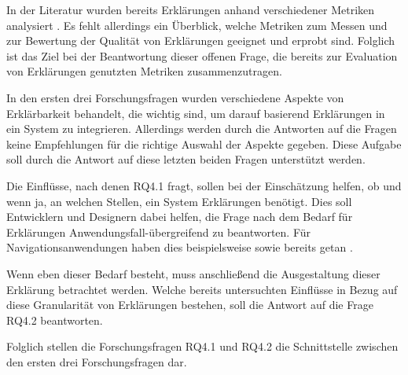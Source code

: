 In der Literatur wurden bereits Erklärungen anhand verschiedener Metriken analysiert \cite{wiegand2019drive,briand1995goal}. Es fehlt allerdings ein Überblick, welche Metriken zum Messen und zur Bewertung der Qualität von Erklärungen geeignet und erprobt sind. Folglich ist das Ziel bei der Beantwortung dieser offenen Frage, die bereits zur Evaluation von Erklärungen genutzten Metriken zusammenzutragen.

\smallskip

\noindent{}

\smallskip

In den ersten drei Forschungsfragen wurden verschiedene Aspekte von Erklärbarkeit behandelt, die wichtig sind, um darauf basierend Erklärungen in ein System zu integrieren. Allerdings werden durch die Antworten auf die Fragen keine Empfehlungen für die richtige Auswahl der Aspekte gegeben. Diese Aufgabe soll durch die Antwort auf diese letzten beiden Fragen unterstützt werden.

Die Einflüsse, nach denen RQ4.1 fragt, sollen bei der Einschätzung helfen, ob und wenn ja, an welchen Stellen, ein System Erklärungen benötigt. Dies soll Entwicklern und Designern dabei helfen, die Frage nach dem Bedarf für Erklärungen Anwendungsfall-übergreifend zu beantworten. Für Navigationsanwendungen haben dies beispielsweise \citeauthor{chazette_end-users_nodate} sowie \citeauthor{wang_integration_2020} bereits getan \cite{chazette_end-users_nodate,wang_integration_2020}.

Wenn eben dieser Bedarf besteht, muss anschließend die Ausgestaltung dieser Erklärung betrachtet werden. Welche bereits untersuchten Einflüsse in Bezug auf diese Granularität von Erklärungen bestehen, soll die Antwort auf die Frage RQ4.2 beantworten.

Folglich stellen die Forschungsfragen RQ4.1 und RQ4.2 die Schnittstelle zwischen den ersten drei Forschungsfragen dar.